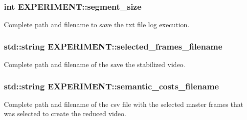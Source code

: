 \subsubsection[{\texorpdfstring{segment\+\_\+size}{segment\_size}}]{\setlength{\rightskip}{0pt plus 5cm}int E\+X\+P\+E\+R\+I\+M\+E\+N\+T\+::segment\+\_\+size}\hypertarget{structEXPERIMENT_a004195c9cb30dde7a5cac231381503da}{}\label{structEXPERIMENT_a004195c9cb30dde7a5cac231381503da}


Complete path and filename to save the txt file log execution. 

\subsubsection[{\texorpdfstring{selected\+\_\+frames\+\_\+filename}{selected\_frames\_filename}}]{\setlength{\rightskip}{0pt plus 5cm}std\+::string E\+X\+P\+E\+R\+I\+M\+E\+N\+T\+::selected\+\_\+frames\+\_\+filename}\hypertarget{structEXPERIMENT_aef88dd45b0ad1db5f6b68b0801f6f630}{}\label{structEXPERIMENT_aef88dd45b0ad1db5f6b68b0801f6f630}


Complete path and filename of the save the stabilized video. 

\subsubsection[{\texorpdfstring{semantic\+\_\+costs\+\_\+filename}{semantic\_costs\_filename}}]{\setlength{\rightskip}{0pt plus 5cm}std\+::string E\+X\+P\+E\+R\+I\+M\+E\+N\+T\+::semantic\+\_\+costs\+\_\+filename}\hypertarget{structEXPERIMENT_ab71731194cb1680b25dd9ed253e455aa}{}\label{structEXPERIMENT_ab71731194cb1680b25dd9ed253e455aa}


Complete path and filename of the csv file with the selected master frames that was selected to create the reduced video. 

